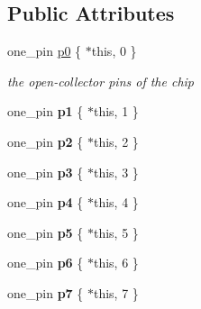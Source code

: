 \subsection*{Public Attributes}
{\bf }\par
\begin{DoxyCompactItemize}
\item 
one\+\_\+pin \hyperlink{classhwlib_1_1pcf8574a_a3824ca4c8ff662663dba2abf10a4a946}{p0} \{ $\ast$this, 0 \}
\begin{DoxyCompactList}\small\item\em the open-\/collector pins of the chip \end{DoxyCompactList}\item 
one\+\_\+pin {\bfseries p1} \{ $\ast$this, 1 \}\hypertarget{classhwlib_1_1pcf8574a_a1adc6413e58a9b827fa996402b18eff7}{}\label{classhwlib_1_1pcf8574a_a1adc6413e58a9b827fa996402b18eff7}

\item 
one\+\_\+pin {\bfseries p2} \{ $\ast$this, 2 \}\hypertarget{classhwlib_1_1pcf8574a_a73d8c9cd3688de0e3e7fd5cb58b9a2bd}{}\label{classhwlib_1_1pcf8574a_a73d8c9cd3688de0e3e7fd5cb58b9a2bd}

\item 
one\+\_\+pin {\bfseries p3} \{ $\ast$this, 3 \}\hypertarget{classhwlib_1_1pcf8574a_af74d66fd9f15618691755b2a9df5e7e7}{}\label{classhwlib_1_1pcf8574a_af74d66fd9f15618691755b2a9df5e7e7}

\item 
one\+\_\+pin {\bfseries p4} \{ $\ast$this, 4 \}\hypertarget{classhwlib_1_1pcf8574a_aa92b5eb9c4662e8693e481e70df36dee}{}\label{classhwlib_1_1pcf8574a_aa92b5eb9c4662e8693e481e70df36dee}

\item 
one\+\_\+pin {\bfseries p5} \{ $\ast$this, 5 \}\hypertarget{classhwlib_1_1pcf8574a_a1ee5d90ff44bc9ecd36be9a0c631a8be}{}\label{classhwlib_1_1pcf8574a_a1ee5d90ff44bc9ecd36be9a0c631a8be}

\item 
one\+\_\+pin {\bfseries p6} \{ $\ast$this, 6 \}\hypertarget{classhwlib_1_1pcf8574a_a4702f96da190fda4a82fd5c618c5adad}{}\label{classhwlib_1_1pcf8574a_a4702f96da190fda4a82fd5c618c5adad}

\item 
one\+\_\+pin {\bfseries p7} \{ $\ast$this, 7 \}\hypertarget{classhwlib_1_1pcf8574a_a57afc965233d2989de8dc9c51fa5faf5}{}\label{classhwlib_1_1pcf8574a_a57afc965233d2989de8dc9c51fa5faf5}

\end{DoxyCompactItemize}



